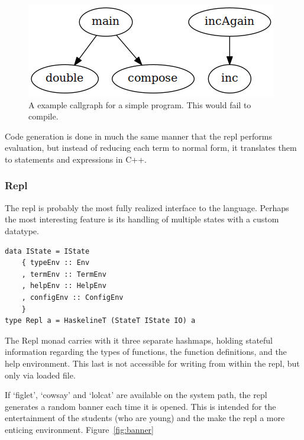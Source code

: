 \documentclass[12pt, a4paper]{report}
\begin{document}
\begin{figure}
    \includegraphics[scale=0.6]{images/callgraph.png}
    {\caption{A example callgraph for a simple program. This would fail to compile.}
\label{fig:callgraph}}
\end{figure}

Code generation is done in much the same manner that the repl performs evaluation, but instead of
reducing each term to normal form, it translates them to statements and expressions in C++. 

\subsubsection{Repl}
The repl is probably the most fully realized interface to the language. Perhaps the most interesting
feature is its handling of multiple states with a custom datatype. 

\begin{verbatim}
data IState = IState
    { typeEnv :: Env
    , termEnv :: TermEnv
    , helpEnv :: HelpEnv
    , configEnv :: ConfigEnv
    }
type Repl a = HaskelineT (StateT IState IO) a
\end{verbatim}

The Repl monad carries with it three separate hashmaps, holding stateful information regarding the
types of functions, the function definitions, and the help environment. This last is not accessible
for writing from within the repl, but only via loaded file.

If `figlet', `cowsay' and `lolcat' are available on the system path, the repl generates a random
banner each time it is opened. This is intended for the entertainment of the students (who are
young) and the make the repl a more enticing environment. Figure~\ref{fig:banner}
\end{document}
